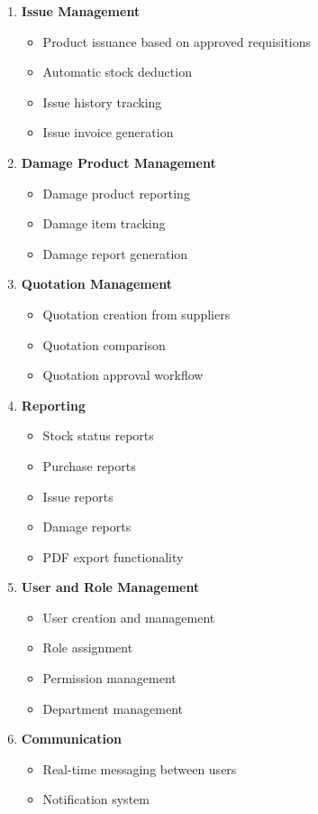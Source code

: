 \begin{enumerate}
    \item \textbf{Issue Management}
    \begin{itemize}
        \item Product issuance based on approved requisitions
        \item Automatic stock deduction
        \item Issue history tracking
        \item Issue invoice generation
    \end{itemize}

    \item \textbf{Damage Product Management}
    \begin{itemize}
        \item Damage product reporting
        \item Damage item tracking
        \item Damage report generation
    \end{itemize}

    \item \textbf{Quotation Management}
    \begin{itemize}
        \item Quotation creation from suppliers
        \item Quotation comparison
        \item Quotation approval workflow
    \end{itemize}

    \item \textbf{Reporting}
    \begin{itemize}
        \item Stock status reports
        \item Purchase reports
        \item Issue reports
        \item Damage reports
        \item PDF export functionality
    \end{itemize}

    \item \textbf{User and Role Management}
    \begin{itemize}
        \item User creation and management
        \item Role assignment
        \item Permission management
        \item Department management
    \end{itemize}

    \item \textbf{Communication}
    \begin{itemize}
        \item Real-time messaging between users
        \item Notification system
    \end{itemize}
\end{enumerate}

